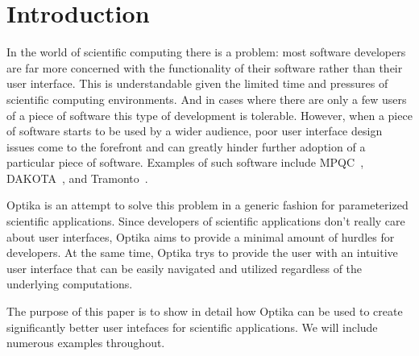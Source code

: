 \section{Introduction}
In the world of scientific computing there is a problem: most software 
developers are far more concerned with the functionality of their software 
rather than their user interface. This is understandable given
the limited time and pressures of scientific computing environments. And in 
cases where there are only a few users of a piece of software this type of 
development is tolerable. However, when a piece of software starts to be used 
by a wider audience, poor user interface design issues come to the forefront 
and can greatly hinder further adoption of a particular piece of software. 
Examples of such software include MPQC~\cite{mpqc}, DAKOTA~\cite{dakota}, and 
Tramonto~\cite{tramonto}.

Optika is an attempt to solve this
problem in a generic fashion for parameterized scientific applications.
Since developers of scientific applications don't really care about user 
interfaces, Optika aims to provide a minimal amount of hurdles for developers. 
At the same time, Optika trys to provide the user with an intuitive user
interface that can be easily navigated and utilized regardless of the 
underlying computations.

The purpose of this paper is to show in detail how Optika can be used to create
significantly better user intefaces for scientific applications. We will include
numerous examples throughout.
